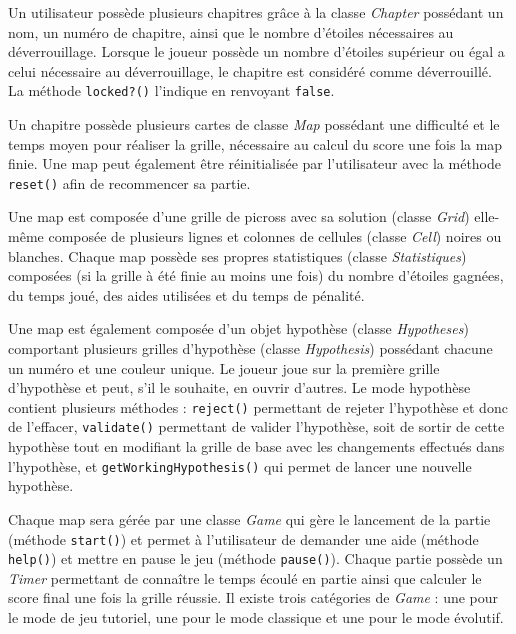\documentclass{report}
\begin{document}
\medskip

	Un utilisateur possède plusieurs chapitres grâce à la classe \textit{Chapter} possédant un nom, un numéro de chapitre, ainsi que le nombre d'étoiles nécessaires au déverrouillage. Lorsque le joueur possède un nombre d'étoiles supérieur ou égal a celui nécessaire au déverrouillage, le chapitre est considéré comme déverrouillé. La méthode \texttt{locked?()} l'indique en renvoyant \texttt{false}.
	
\medskip

	Un chapitre possède plusieurs cartes de classe \textit{Map} possédant une difficulté et le temps moyen pour réaliser la grille, nécessaire au calcul du score une fois la map finie. Une map peut également être réinitialisée par l'utilisateur avec la méthode \texttt{reset()} afin de recommencer sa partie.
	
\medskip

	Une map est composée d'une grille de picross avec sa solution (classe \textit{Grid}) elle-même composée de plusieurs lignes et colonnes de cellules (classe \textit{Cell}) noires ou blanches. Chaque map possède ses propres statistiques (classe \textit{Statistiques}) composées (si la grille à été finie au moins une fois) du nombre d'étoiles gagnées, du temps joué, des aides utilisées et du temps de pénalité.
	
\medskip

	Une map est également composée d'un objet hypothèse (classe \textit{Hypotheses}) comportant plusieurs grilles d'hypothèse (classe \textit{Hypothesis}) possédant chacune un numéro et une couleur unique. Le joueur joue sur la première grille d'hypothèse et peut, s'il le souhaite, en ouvrir d'autres. Le mode hypothèse contient plusieurs méthodes : \texttt{reject()} permettant de rejeter l'hypothèse et donc de l'effacer, \texttt{validate()} permettant de valider l'hypothèse, soit de sortir de cette hypothèse tout en modifiant la grille de base avec les changements effectués dans l'hypothèse, et \texttt{getWorkingHypothesis()} qui permet de lancer une nouvelle hypothèse.
	
\medskip

	Chaque map sera gérée par une classe \textit{Game} qui gère le lancement de la partie (méthode \texttt{start()}) et  permet à l'utilisateur de demander une aide (méthode \texttt{help()}) et  mettre en pause le jeu (méthode \texttt{pause()}). Chaque partie possède un \textit{Timer} permettant de connaître le temps écoulé en partie ainsi que calculer le score final une fois la grille réussie. Il existe trois catégories de \textit{Game} : une pour le mode de jeu tutoriel, une pour le mode classique et une pour le mode évolutif.
\end{document}
